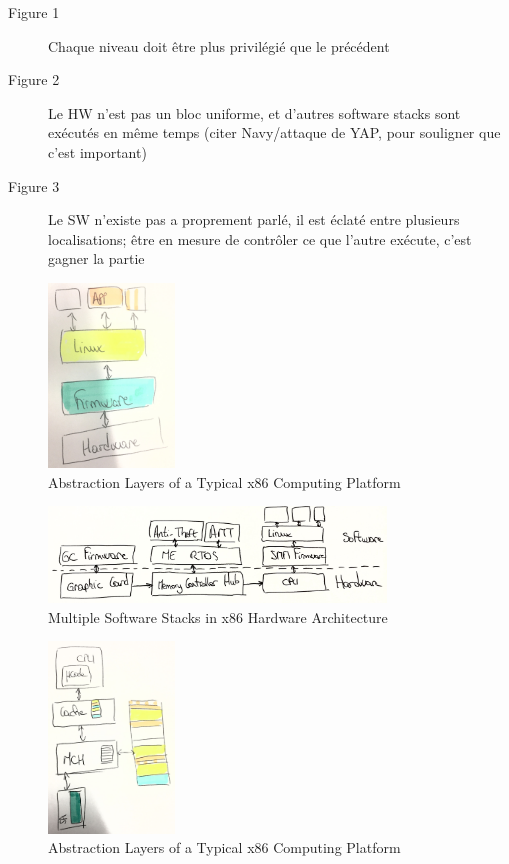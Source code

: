\begin{description}
\item [Figure 1] Chaque niveau doit être plus privilégié que le précédent
\item [Figure 2] Le HW n’est pas un bloc uniforme, et d’autres software stacks
  sont exécutés en même temps (citer Navy/attaque de YAP, pour souligner que
  c’est important)
\item [Figure 3] Le SW n'existe pas a proprement parlé, il est éclaté entre
  plusieurs localisations; être en mesure de contrôler ce que l’autre exécute,
  c’est gagner la partie
\end{description}

\begin{figure}
  \centering
  \includegraphics[width=0.3\textwidth]{Figures/computing-platform-1.jpg}
  \caption{Abstraction Layers of a Typical x86 Computing Platform}
  \label{fig:usecase:computing-platform}
\end{figure}

\begin{figure}
  \centering
  \includegraphics[width=0.8\textwidth]{Figures/intro-computing-platform.jpg}
  \caption{Multiple Software Stacks in x86 Hardware Architecture}
  \label{fig:usecase:computing-platform}
\end{figure}

\begin{figure}
  \centering
  \includegraphics[width=0.3\textwidth]{Figures/computing-platform-3.jpg}
  \caption{Abstraction Layers of a Typical x86 Computing Platform}
  \label{fig:usecase:computing-platform}
\end{figure}

